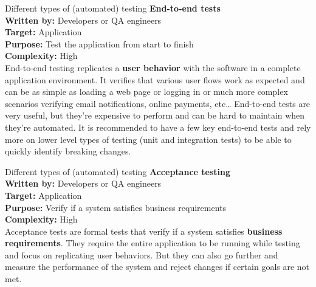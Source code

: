 \documentclass[
  ignorenonframetext,
  american,
  t,
  aspectratio=169]{beamer}
\begin{document}
\begin{frame}{Different types of (automated) testing}
\protect{}\label{different-types-of-automated-testing-6}
\textbf{End-to-end tests}\\
\textbf{Written by:} Developers or QA engineers\\
\textbf{Target:} Application\\
\textbf{Purpose:} Test the application from start to finish\\
\textbf{Complexity:} High\\
End-to-end testing replicates a \textbf{user behavior} with the software
in a complete application environment. It verifies that various user
flows work as expected and can be as simple as loading a web page or
logging in or much more complex scenarios verifying email notifications,
online payments, etc… End-to-end tests are very useful, but they’re
expensive to perform and can be hard to maintain when they’re automated.
It is recommended to have a few key end-to-end tests and rely more on
lower level types of testing (unit and integration tests) to be able to
quickly identify breaking changes.
\end{frame}

\begin{frame}{Different types of (automated) testing}
\protect{}\label{different-types-of-automated-testing-7}
\textbf{Acceptance testing}\\
\textbf{Written by:} Developers or QA engineers\\
\textbf{Target:} Application\\
\textbf{Purpose:} Verify if a system satisfies business requirements\\
\textbf{Complexity:} High\\
Acceptance tests are formal tests that verify if a system satisfies
\textbf{business requirements}. They require the entire application to
be running while testing and focus on replicating user behaviors. But
they can also go further and measure the performance of the system and
reject changes if certain goals are not met.
\end{frame}
\end{document}
